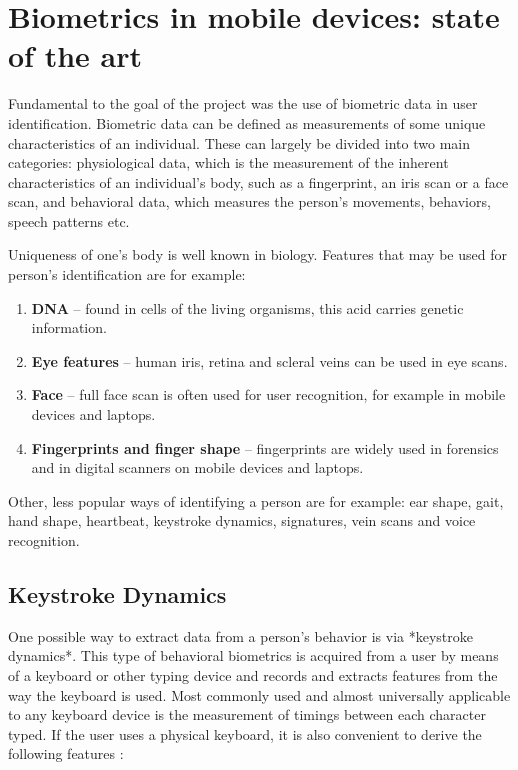 
\chapter{Biometrics in mobile devices: state of the art}

Fundamental to the goal of the project was the use of biometric data in user identification. Biometric data can be defined as measurements of some unique characteristics of an individual. These can largely be divided into two main categories: physiological data, which is the measurement of the inherent characteristics of an individual's body, such as a fingerprint, an iris scan or a face scan, and behavioral data, which measures the person's movements, behaviors, speech patterns etc. \cite{Abde2023}

Uniqueness of one's body is well known in biology. Features that may be used for person's identification are for example: \cite{biometrics_institute_2025}

\begin{enumerate}
    \item \textbf{DNA} -- found in cells of the living organisms, this acid carries genetic information.
    \item \textbf{Eye features} -- human iris, retina and scleral veins can be used in eye scans.
    \item \textbf{Face} -- full face scan is often used for user recognition, for example in mobile devices and laptops. \cite{google_mlkit_face_detection_2025}
    \item \textbf{Fingerprints and finger shape} -- fingerprints are widely used in forensics \cite{nist_forensic_biometrics_2025} and in digital scanners on mobile devices and laptops.
\end{enumerate}

Other, less popular ways of identifying a person are for example: ear shape, gait, hand shape, heartbeat, keystroke dynamics, signatures, vein scans and voice recognition.

\section{Keystroke Dynamics}
One possible way to extract data from a person's behavior is via *keystroke dynamics*. This type of behavioral biometrics is acquired from a user by means of a keyboard or other typing device and records and extracts features from the way the keyboard is used. Most commonly used and almost universally applicable to any keyboard device is the measurement of timings between each character typed. If the user uses a physical keyboard, it is also convenient to derive the following features \cite{Shar2023}:

